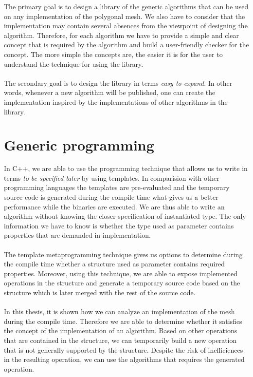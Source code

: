 The primary goal is to design a library of the generic algorithms that can be used on any
implementation of the polygonal mesh. We also have to consider that the implementation
may contain several absences from the viewpoint of designing the algorithm. Therefore, for each
algorithm we have to provide a simple and clear concept that is required by the algorithm
and build a user-friendly checker for the concept. The more simple the concepts are, the easier
it is for the user to understand the technique for using the library.\\
\\
The secondary goal is to design the library in terms \emph{easy-to-expand}. In other words,
whenever a new algorithm will be published, one can create the implementation inspired
by the implementations of other algorithms in the library.

\section*{Generic programming}

In C++, we are able to use the programming technique that allows us to write in terms
\emph{to-be-specified-later} by using templates. In comparision with other programming languages
the templates are pre-evaluated and the temporary source code is generated during the
compile time what gives us a better performance while the binaries are executed.
We are thus able to write an algorithm
without knowing the closer specification of instantiated type. The only information we have
to know is whether the type used as parameter contains properties that are demanded in implementation.\\
\\
The template metaprogramming technique gives us options to determine during the compile time whether
a structure used as parameter contains required properties. Moreover, using this technique,
we are able to expose implemented operations in the structure and generate a temporary source
code based on the structure which is later merged with the rest of the source code.\\
\\
In this thesis, it is shown how we can analyze an implementation of the mesh during the compile time.
Therefore we are able to determine whether it satisfies the concept of the implementation of
an algorithm. Based on other operations that are contained in the structure, we can temporarily build a new
operation that is not generally supported by the structure. Despite the risk of inefficiences in
the resulting operation, we can use the algorithms that requires the generated operation.
